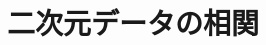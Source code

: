 \documentclass[../../topic_statistics]{subfiles}
\begin{document}
\chapter{二次元データの相関}



\end{document}
